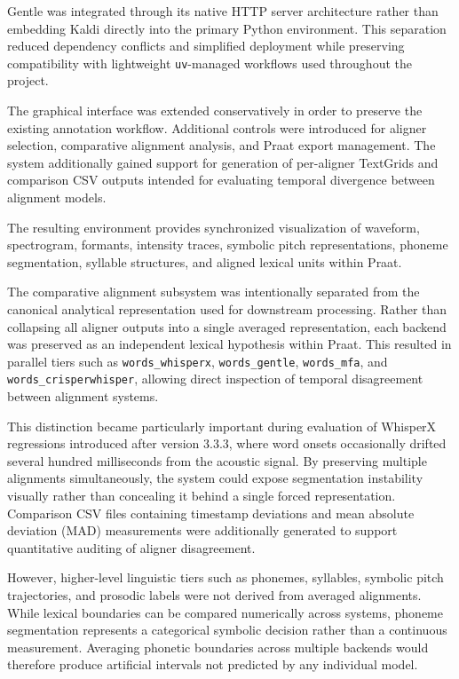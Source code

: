 Gentle was integrated through its native HTTP server architecture rather than embedding Kaldi directly into the primary Python environment. This separation reduced dependency conflicts and simplified deployment while preserving compatibility with lightweight \texttt{uv}-managed workflows used throughout the project.

The graphical interface was extended conservatively in order to preserve the existing annotation workflow. Additional controls were introduced for aligner selection, comparative alignment analysis, and Praat export management. The system additionally gained support for generation of per-aligner TextGrids and comparison CSV outputs intended for evaluating temporal divergence between alignment models.

The resulting environment provides synchronized visualization of waveform, spectrogram, formants, intensity traces, symbolic pitch representations, phoneme segmentation, syllable structures, and aligned lexical units within Praat.

The comparative alignment subsystem was intentionally separated from the canonical analytical representation used for downstream processing. Rather than collapsing all aligner outputs into a single averaged representation, each backend was preserved as an independent lexical hypothesis within Praat. This resulted in parallel tiers such as \texttt{words\_whisperx}, \texttt{words\_gentle}, \texttt{words\_mfa}, and \texttt{words\_crisperwhisper}, allowing direct inspection of temporal disagreement between alignment systems.

This distinction became particularly important during evaluation of WhisperX regressions introduced after version 3.3.3, where word onsets occasionally drifted several hundred milliseconds from the acoustic signal. By preserving multiple alignments simultaneously, the system could expose segmentation instability visually rather than concealing it behind a single forced representation. Comparison CSV files containing timestamp deviations and mean absolute deviation (MAD) measurements were additionally generated to support quantitative auditing of aligner disagreement.

However, higher-level linguistic tiers such as phonemes, syllables, symbolic pitch trajectories, and prosodic labels were not derived from averaged alignments. While lexical boundaries can be compared numerically across systems, phoneme segmentation represents a categorical symbolic decision rather than a continuous measurement. Averaging phonetic boundaries across multiple backends would therefore produce artificial intervals not predicted by any individual model.


